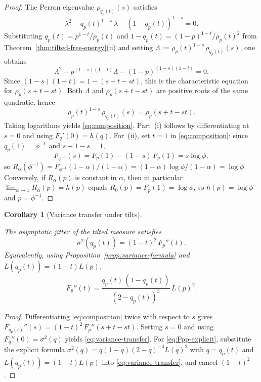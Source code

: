 \documentclass[pdflatex,sn-basic,Numbered]{sn-jnl}
\theoremstyle{thmstyleone}
\newtheorem{corollary}[theorem]{Corollary}
\theoremstyle{thmstyletwo}
\theoremstyle{thmstylethree}
\newcommand{\leanverified}[1]{}
\begin{document}
\begin{proof}
The Perron eigenvalue $\rho_{q_p(t)}(s)$ satisfies
\[
\lambda^2 - q_p(t)^{1-s}\,\lambda - (1-q_p(t))^{1-s}=0.
\]
Substituting $q_p(t)=p^{1-t}/\rho_p(t)$ and $1-q_p(t)=(1-p)^{1-t}/\rho_p(t)^2$ from Theorem~\ref{thm:tilted-free-energy}(ii) and setting $\Lambda:=\rho_p(t)^{1-s}\,\rho_{q_p(t)}(s)$, one obtains
\[
\Lambda^2 - p^{(1-s)(1-t)}\Lambda - (1-p)^{(1-s)(1-t)}=0.
\]
Since $(1-s)(1-t)=1-(s+t-st)$, this is the characteristic equation for $\rho_p(s+t-st)$. Both $\Lambda$ and $\rho_p(s+t-st)$ are positive roots of the same quadratic, hence
\[
\rho_p(t)^{1-s}\,\rho_{q_p(t)}(s)=\rho_p(s+t-st).
\]
Taking logarithms yields \eqref{eq:composition}. Part~(i) follows by differentiating at $s=0$ and using $F_q'(0)=h(q)$. For~(ii), set $t=1$ in \eqref{eq:composition}: since $q_p(1)=\phi^{-1}$ and $s+1-s=1$,
\[
F_{\phi^{-1}}(s) = F_p(1)-(1-s)\,F_p(1)=s\log\phi,
\]
so $R_\alpha(\phi^{-1})=F_{\phi^{-1}}(1-\alpha)/(1-\alpha)=(1-\alpha)\log\phi/(1-\alpha)=\log\phi$. Conversely, if $R_\alpha(p)$ is constant in $\alpha$, then in particular $\lim_{\alpha\to 1}R_\alpha(p)=h(p)$ equals $R_0(p)=F_p(1)=\log\phi$, so $h(p)=\log\phi$ and $p=\phi^{-1}$.
\end{proof}

\begin{corollary}[Variance transfer under tilts]\label{cor:variance-transfer}
\leanverified{paper_zero_jitter_variance_transfer}
The asymptotic jitter of the tilted measure satisfies
\begin{equation}\label{eq:variance-transfer}
\sigma^2(q_p(t)) = (1-t)^2\,F_p''(t).
\end{equation}
Equivalently, using Proposition~\ref{prop:variance-formula} and $L(q_p(t))=(1-t)L(p)$,
\begin{equation}\label{eq:Fpp-explicit}
F_p''(t) = \frac{q_p(t)\,(1-q_p(t))}{(2-q_p(t))^3}\,L(p)^2.
\end{equation}
\end{corollary}

\begin{proof}
Differentiating \eqref{eq:composition} twice with respect to $s$ gives $F_{q_p(t)}''(s)=(1-t)^2\,F_p''(s+t-st)$. Setting $s=0$ and using $F_q''(0)=\sigma^2(q)$ yields \eqref{eq:variance-transfer}. For \eqref{eq:Fpp-explicit}, substitute the explicit formula $\sigma^2(q)=q(1-q)(2-q)^{-3}L(q)^2$ with $q=q_p(t)$ and $L(q_p(t))=(1-t)L(p)$ into \eqref{eq:variance-transfer}, and cancel $(1-t)^2$.
\end{proof}
\end{document}
